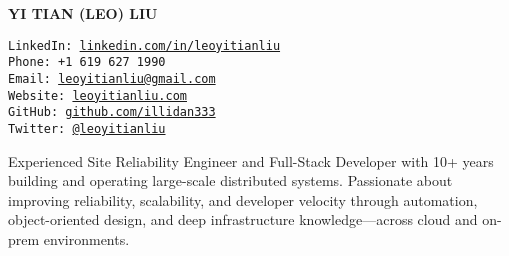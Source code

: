 \documentclass[9pt]{developercv}
\begin{document}

\begin{minipage}[t]{0.45\textwidth}
  \vspace{-\baselineskip}
  {\Huge \textbf{\MakeUppercase{Yi Tian (Leo) Liu}}}
  \vspace{6pt}
\end{minipage}
\begin{minipage}[t]{0.55\textwidth}
  \vspace{-\baselineskip}
  \texttt{LinkedIn: \href{https://www.linkedin.com/in/leoyitianliu/}{linkedin.com/in/leoyitianliu}} \\
  \texttt{Phone: +1 619 627 1990} \\
  \texttt{Email: \href{mailto:leoyitianliu@gmail.com}{leoyitianliu@gmail.com}} \\
  \texttt{Website: \href{https://leoyitianliu.com}{leoyitianliu.com}} \\
  \texttt{GitHub: \href{https://github.com/illidan333}{github.com/illidan333}} \\
  \texttt{Twitter: \href{https://twitter.com/@leoyitianliu}{@leoyitianliu}} \\
\end{minipage}

\vspace{0.5cm}



\begin{minipage}[t]{0.45\textwidth}
  \vspace{-\baselineskip}
  Experienced Site Reliability Engineer and Full-Stack Developer with 10+ years building and operating large-scale distributed systems. Passionate about improving reliability, scalability, and developer velocity through automation, object-oriented design, and deep infrastructure knowledge—across cloud and on-prem environments.
\end{minipage}
\hfill
\begin{minipage}[t]{0.5\textwidth}
  \vspace{-\baselineskip}
  \begin{barchart}{5.5}
  \end{barchart}
\end{minipage}
\end{document}
